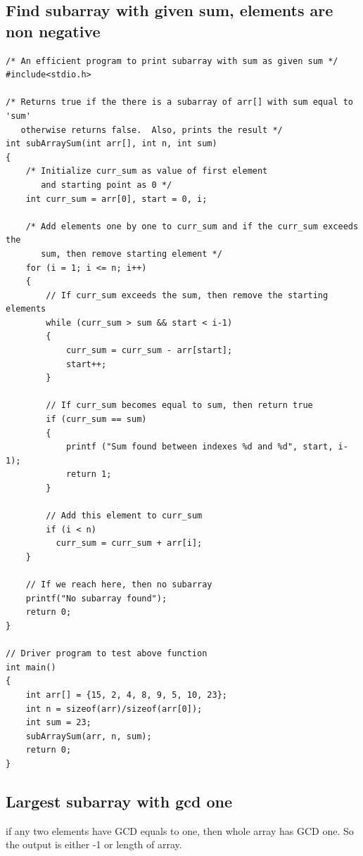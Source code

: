 \documentclass[8pt, a4paper, oneside, twocolumn]{extarticle}
\begin{document}
\subsection{Find subarray with given sum, elements are non negative}
\begin{verbatim}
/* An efficient program to print subarray with sum as given sum */
#include<stdio.h> 
  
/* Returns true if the there is a subarray of arr[] with sum equal to 'sum' 
   otherwise returns false.  Also, prints the result */
int subArraySum(int arr[], int n, int sum) 
{ 
    /* Initialize curr_sum as value of first element 
       and starting point as 0 */
    int curr_sum = arr[0], start = 0, i; 
  
    /* Add elements one by one to curr_sum and if the curr_sum exceeds the 
       sum, then remove starting element */
    for (i = 1; i <= n; i++) 
    { 
        // If curr_sum exceeds the sum, then remove the starting elements 
        while (curr_sum > sum && start < i-1) 
        { 
            curr_sum = curr_sum - arr[start]; 
            start++; 
        } 
  
        // If curr_sum becomes equal to sum, then return true 
        if (curr_sum == sum) 
        { 
            printf ("Sum found between indexes %d and %d", start, i-1); 
            return 1; 
        } 
  
        // Add this element to curr_sum 
        if (i < n) 
          curr_sum = curr_sum + arr[i]; 
    } 
  
    // If we reach here, then no subarray 
    printf("No subarray found"); 
    return 0; 
} 
  
// Driver program to test above function 
int main() 
{ 
    int arr[] = {15, 2, 4, 8, 9, 5, 10, 23}; 
    int n = sizeof(arr)/sizeof(arr[0]); 
    int sum = 23; 
    subArraySum(arr, n, sum); 
    return 0; 
} 
\end{verbatim}
\subsection{Largest subarray with gcd one}
if any two elements have GCD equals to one, then whole array has GCD one. So the output is either -1 or length of array.
\end{document}
